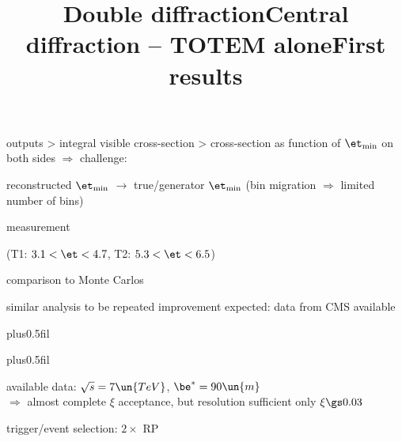 \> outputs
\>> integral visible cross-section
\>> cross-section as function of $\et_{\rm min}$ on both sides $\Rightarrow$ challenge:

\centerline{reconstructed $\et_{\rm min}$ $\longrightarrow$ true/generator $\et_{\rm min}$ \hskip5mm (bin migration $\Rightarrow$ limited number of bins)}


\newpage %
\title{Double diffraction}


\noindent{}

\> measurement

\centerline{}

\centerline{(T1: $3.1 < \et < 4.7$, T2: $5.3 < \et < 6.5$)}

\> comparison to Monte Carlos

\centerline{}


\vfil
\noindent{}

{
\> similar analysis to be repeated
\> improvement expected: data from CMS available
}


\newpage %
\hbox{}
\vfil
\title{Central diffraction -- TOTEM alone}

\vskip0pt plus0.5fil

\vskip0pt plus0.5fil


\newpage %
\title{First results}

\> available data: $\sqrt s = 7\un{TeV}$, $\be^* = 90\un{m}$\\
$\Rightarrow$ almost complete $\xi$ acceptance, but resolution sufficient only $\xi \gs 0.03$

\> trigger/event selection: $2\times$ RP

